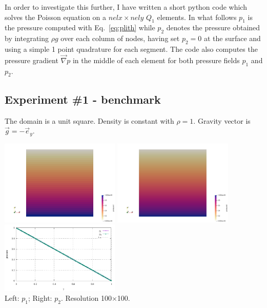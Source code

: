 \vspace{1cm}

In order to investigate this further, I have written a short python code which solves the Poisson equation 
on a $nelx\times nely$ $Q_1$ elements.
In what follows $p_1$ is the pressure computed with Eq.~\eqref{eq:plith} while $p_2$ denotes the pressure
obtained by integrating $\rho {g}$ over each column of nodes, having set $p_2=0$ at the surface and 
using a simple 1 point quadrature for each segment.
The code also computes the pressure gradient $\vec\nabla p$ in the middle of each element for both 
pressure fields $p_1$ and $p_2$. 

\newpage
\subsection*{Experiment \#1 - benchmark}

The domain is a unit square. Density is constant with $\rho=1$. Gravity vector is $\vec{g}=-\vec{e}_y$.

\begin{center}
\includegraphics[width=5.7cm]{python_codes/fieldstone_119/results/exp1/p1}
\includegraphics[width=5.7cm]{python_codes/fieldstone_119/results/exp1/p2}
\includegraphics[width=5.7cm]{python_codes/fieldstone_119/results/exp1/profile.pdf}\\
{\captionfont Left: $p_1$; Right: $p_2$. Resolution 100$\times$100.}
\end{center}

